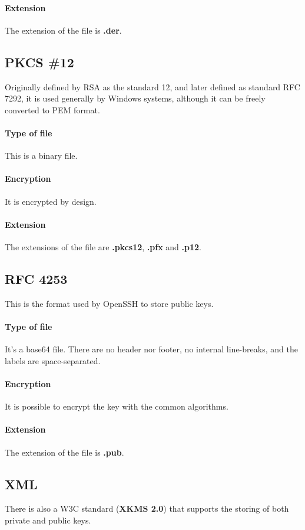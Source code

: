 \documentclass[11 pt]{article}
\begin{document}
\paragraph*{Extension}
The extension of the file is \textbf{.der}.

\subsection{PKCS \#12}
Originally defined by RSA as the standard 12, and later defined as standard RFC 7292, it is used generally by Windows systems, although it can be freely converted to PEM format.
\paragraph*{Type of file}
This is a binary file.
\paragraph*{Encryption}
It is encrypted by design.
\paragraph*{Extension}
The extensions of the file are \textbf{.pkcs12}, \textbf{.pfx} and \textbf{.p12}.

\subsection{RFC 4253}
This is the format used by OpenSSH to store public keys.
\paragraph*{Type of file}
It's a base64 file. There are no header nor footer, no internal line-breaks, and the labels are space-separated.
\paragraph*{Encryption}
It is possible to encrypt the key with the common algorithms.
\paragraph*{Extension}
The extension of the file is \textbf{.pub}.

\subsection{XML}
There is also a W3C standard (\textbf{XKMS 2.0}) that supports the storing of both private and public keys.
\end{document}
